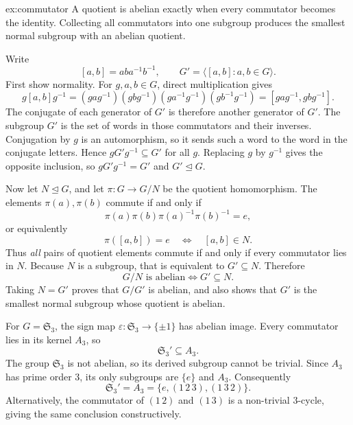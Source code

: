 \begin{solution}{ex:commutator}
\idea A quotient is abelian exactly when every commutator becomes the identity. Collecting all commutators into one subgroup produces the smallest normal subgroup with an abelian quotient.

\writeup Write
\[
[a,b]=aba^{-1}b^{-1},\qquad
G'=\langle[a,b]:a,b\in G\rangle.
\]
First show normality. For $g,a,b\in G$, direct multiplication gives
\[
g[a,b]g^{-1}
=(gag^{-1})(gbg^{-1})(ga^{-1}g^{-1})(gb^{-1}g^{-1})
=[gag^{-1},gbg^{-1}].
\]
The conjugate of each generator of $G'$ is therefore another generator of $G'$. The subgroup $G'$ is the set of words in those commutators and their inverses. Conjugation by $g$ is an automorphism, so it sends such a word to the word in the conjugate letters. Hence $gG'g^{-1}\subseteq G'$ for all $g$. Replacing $g$ by $g^{-1}$ gives the opposite inclusion, so $gG'g^{-1}=G'$ and $G'\trianglelefteq G$.

Now let $N\trianglelefteq G$, and let $\pi:G\to G/N$ be the quotient homomorphism. The elements $\pi(a),\pi(b)$ commute if and only if
\[
\pi(a)\pi(b)\pi(a)^{-1}\pi(b)^{-1}=e,
\]
or equivalently
\[
\pi([a,b])=e
\quad\Longleftrightarrow\quad[a,b]\in N.
\]
Thus \emph{all} pairs of quotient elements commute if and only if every commutator lies in $N$. Because $N$ is a subgroup, that is equivalent to $G'\subseteq N$. Therefore
\[
\boxed{G/N\text{ is abelian}\iff G'\subseteq N}.
\]
Taking $N=G'$ proves that $G/G'$ is abelian, and also shows that $G'$ is the smallest normal subgroup whose quotient is abelian.

For $G=\mathfrak S_3$, the sign map $\varepsilon:\mathfrak S_3\to\{\pm1\}$ has abelian image. Every commutator lies in its kernel $A_3$, so
\[
\mathfrak S_3'\subseteq A_3.
\]
The group $\mathfrak S_3$ is not abelian, so its derived subgroup cannot be trivial. Since $A_3$ has prime order $3$, its only subgroups are $\{e\}$ and $A_3$. Consequently
\[
\boxed{\mathfrak S_3'=A_3=\{e,(1\,2\,3),(1\,3\,2)\}}.
\]
Alternatively, the commutator of $(1\,2)$ and $(1\,3)$ is a non-trivial $3$-cycle, giving the same conclusion constructively.
\end{solution}

